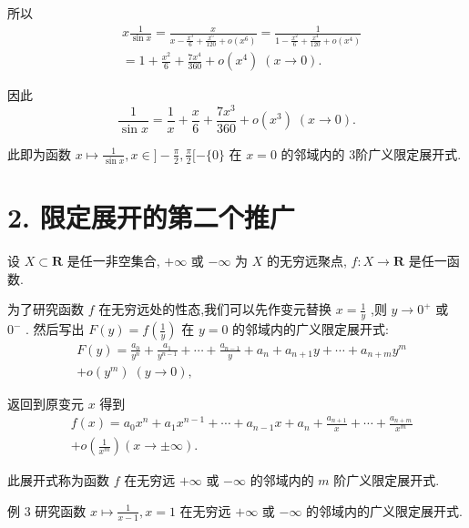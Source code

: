 所以
\begin{align*}
	&x\frac{1}{\sin x} = \frac{x}{x - \frac{{x}^{3}}{6} + \frac{{x}^{5}}{120} + o\left( {x}^{6}\right) } = \frac{1}{1 - \frac{{x}^{2}}{6} + \frac{{x}^{4}}{120} + o\left( {x}^{4}\right) }\\
	&= 1 + \frac{{x}^{2}}{6} + \frac{7{x}^{4}}{360} + o\left( {x}^{4}\right) \;\left( {x \rightarrow  0}\right) .
\end{align*}

因此
$$\frac{1}{\sin x} = \frac{1}{x} + \frac{x}{6} + \frac{7{x}^{3}}{360} + o\left( {x}^{3}\right) \;\left( {x \rightarrow  0}\right) .$$

此即为函数 $x \mapsto  \frac{1}{\sin x},x \in  \rbrack  - \frac{\pi }{2},\frac{\pi }{2}\lbrack  - \{ 0\}$ 在 $x = 0$ 的邻域内的 3阶广义限定展开式.

\section*{2. 限定展开的第二个推广}

设 $X \subset  \mathbf{R}$ 是任一非空集合, $+ \infty$ 或 $- \infty$ 为 $X$ 的无穷远聚点, $f : X \rightarrow  \mathbf{R}$ 是任一函数.

为了研究函数 $f$ 在无穷远处的性态,我们可以先作变元替换 $x = \frac{1}{y}$ ,则 $y \rightarrow  {0}^{ + }$ 或 ${0}^{ - }$ . 然后写出 $F\left( y\right)  = f\left( \frac{1}{y}\right)$ 在 $y = 0$ 的邻域内的广义限定展开式:
\begin{align*}
	&F\left( y\right)  = \frac{{a}_{0}}{{y}^{n}} + \frac{{a}_{1}}{{y}^{n - 1}} + \cdots  + \frac{{a}_{n - 1}}{y} + {a}_{n} + {a}_{n + 1}y + \cdots  + {a}_{n + m}{y}^{m}\\
	&+ o\left( {y}^{m}\right) \;\left( {y \rightarrow  0}\right) ,
\end{align*}

返回到原变元 $x$ 得到
\begin{align*}
	&f\left( x\right)  = {a}_{0}{x}^{n} + {a}_{1}{x}^{n - 1} + \cdots  + {a}_{n - 1}x + {a}_{n} + \frac{{a}_{n + 1}}{x} + \cdots  + \frac{{a}_{n + m}}{{x}^{m}}\\
	&+ o\left( \frac{1}{{x}^{m}}\right) \left( {x \rightarrow   \pm  \infty }\right) .
\end{align*}

此展开式称为函数 $f$ 在无穷远 $+ \infty$ 或 $- \infty$ 的邻域内的 $m$ 阶广义限定展开式.

例 3 研究函数 $x \mapsto  \frac{1}{x - 1},x = 1$ 在无穷远 $+ \infty$ 或 $- \infty$ 的邻域内的广义限定展开式.


